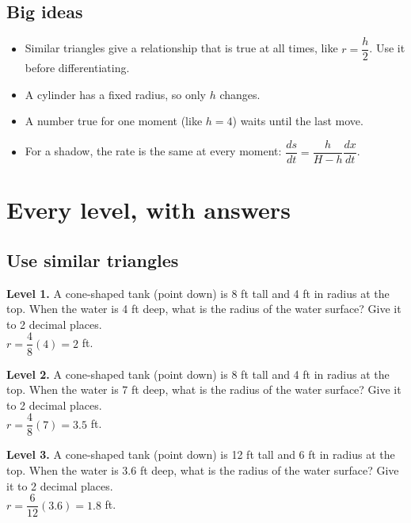 \documentclass[11pt]{article}
\begin{document}
\subsection*{Big ideas}\begin{itemize}\item Similar triangles give a relationship that is true at all times, like $r=\dfrac h2$. Use it before differentiating.
\item A cylinder has a fixed radius, so only $h$ changes.
\item A number true for one moment (like $h=4$) waits until the last move.
\item For a shadow, the rate is the same at every moment: $\dfrac{ds}{dt}=\dfrac{h}{H-h}\dfrac{dx}{dt}$.\end{itemize}
\section*{Every level, with answers}
\subsection*{Use similar triangles}
\noindent\textbf{Level 1.} A cone-shaped tank (point down) is 8 ft tall and 4 ft in radius at the top. When the water is 4 ft deep, what is the radius of the water surface? Give it to 2 decimal places.\\  \quad $r=\dfrac{4}{8}(4)=2$ ft.\par\medskip
\noindent\textbf{Level 2.} A cone-shaped tank (point down) is 8 ft tall and 4 ft in radius at the top. When the water is 7 ft deep, what is the radius of the water surface? Give it to 2 decimal places.\\  \quad $r=\dfrac{4}{8}(7)=3.5$ ft.\par\medskip
\noindent\textbf{Level 3.} A cone-shaped tank (point down) is 12 ft tall and 6 ft in radius at the top. When the water is 3.6 ft deep, what is the radius of the water surface? Give it to 2 decimal places.\\  \quad $r=\dfrac{6}{12}(3.6)=1.8$ ft.\par\medskip
\end{document}

